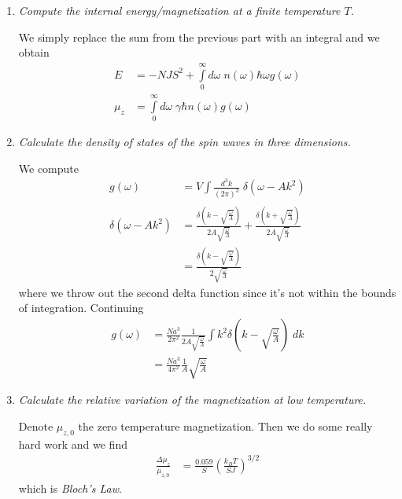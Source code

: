 \documentclass[10pt]{report}
\begin{document}
\begin{enumerate}[1.]
    \item \emph{Compute the internal energy/magnetization at a finite temperature $T$.}

        We simply replace the sum from the previous part with an integral and we obtain
        \begin{align}
            E &= -NJS^2 + \int\limits_{0}^{\infty}d\omega\;n(\omega)\hbar \omega g(\omega)\\
            \mu_z &= \int\limits_{0}^{\infty}d\omega\;\gamma \hbar n(\omega) g(\omega)
        \end{align}

    \item \emph{Calculate the density of states of the spin waves in three dimensions.}

        We compute
        \begin{align}
            g(\omega) &= V\int\limits_{}^{}\frac{d^3k}{(2\pi)^3}\;\delta\left( \omega - Ak^2 \right)\\
            \delta\left( \omega - Ak^2 \right) &= \frac{\delta\left( k - \sqrt{\frac{\omega}{A}} \right)}{2A\sqrt{\frac{\omega}{A}}} + \frac{\delta\left( k + \sqrt{\frac{\omega}{A}} \right)}{2A\sqrt{\frac{\omega}{A}}}\\
            &= \frac{\delta\left( k - \sqrt{\frac{\omega}{A}} \right)}{2\sqrt{\frac{\omega}{A}}}
        \end{align}
        where we throw out the second delta function since it's not within the bounds of integration. Continuing
        \begin{align}
            g(\omega) &= \frac{Na^3}{2\pi^2}\frac{1}{2A\sqrt{\frac{\omega}{A}}}\int\limits_{}^{}k^2 \delta\left( k - \sqrt{\frac{\omega}{A}} \right)\;dk\\
            &= \frac{Na^3}{4\pi^2}\frac{1}{A}\sqrt{\frac{\omega}{A}}
        \end{align}

    \item \emph{Calculate the relative variation of the magnetization at low temperature.}

        Denote $\mu_{z,0}$ the zero temperature magnetization. Then we do some really hard work and we find
        \begin{align}
            \frac{\Delta \mu_z}{\mu_{z,0}} &= \frac{0.059}{S}\left( \frac{k_BT}{SJ} \right)^{3/2}
        \end{align}
        which is \emph{Bloch's Law}.


\end{enumerate}
\end{document}
